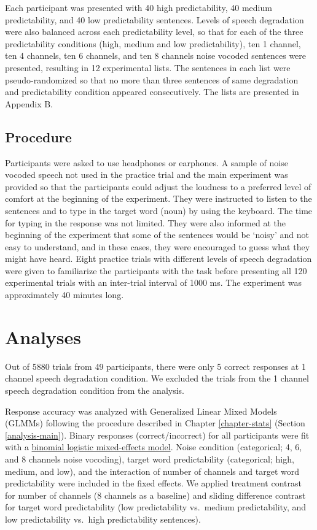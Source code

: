 \documentclass[a4paper, nobind]{templates/ociamthesis}
\begin{document}
Each participant was presented with 40 high predictability, 40 medium predictability, and 40 low predictability sentences.
Levels of speech degradation were also balanced across each predictability level, so that for each of the three predictability conditions (high, medium and low predictability), ten 1 channel, ten 4 channels, ten 6 channels, and ten 8 channels noise vocoded sentences were presented, resulting in 12 experimental lists.
The sentences in each list were pseudo-randomized so that no more than three sentences of same degradation and predictability condition appeared consecutively.
The lists are presented in Appendix B.

\hypertarget{procedure}{%
\subsection{Procedure}\label{procedure}}

Participants were asked to use headphones or earphones.
A sample of noise vocoded speech not used in the practice trial and the main experiment was provided so that the participants could adjust the loudness to a preferred level of comfort at the beginning of the experiment.
They were instructed to listen to the sentences and to type in the target word (noun) by using the keyboard.
The time for typing in the response was not limited.
They were also informed at the beginning of the experiment that some of the sentences would be `noisy' and not easy to understand, and in these cases, they were encouraged to guess what they might have heard.
Eight practice trials with different levels of speech degradation were given to familiarize the participants with the task before presenting all 120 experimental trials with an inter-trial interval of 1000 ms.
The experiment was approximately 40 minutes long.

\hypertarget{analyses}{%
\section{Analyses}\label{analyses}}

Out of 5880 trials from 49 participants, there were only 5 correct responses at 1 channel speech degradation condition.
We excluded the trials from the 1 channel speech degradation condition from the analysis.

Response accuracy was analyzed with Generalized Linear Mixed Models (GLMMs) following the procedure described in Chapter \ref{chapter-stats} (Section \ref{analysis-main}).
Binary responses (correct/incorrect) for all participants were fit with a \protect\hyperlink{binomial-logistic-mixed-effects-model}{binomial logistic mixed-effects model}.
Noise condition (categorical; 4, 6, and 8 channels noise vocoding), target word predictability (categorical; high, medium, and low), and the interaction of number of channels and target word predictability were included in the fixed effects.
We applied treatment contrast for number of channels (8 channels as a baseline) and sliding difference contrast for target word predictability (low predictability vs.~medium predictability, and low predictability vs.~high predictability sentences).
\end{document}
